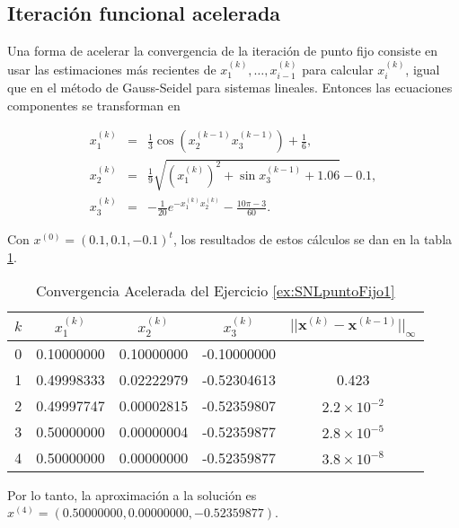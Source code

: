 \subsection{Iteración funcional acelerada}

Una forma de acelerar la convergencia de la iteración de punto fijo consiste en usar las estimaciones más recientes de $x_1^{(k)}, \dots, x_{i-1}^{(k)}$
para calcular $x_i^{(k)}$, igual que en el método de Gauss-Seidel para sistemas lineales. Entonces las ecuaciones componentes se transforman en

\begin{equation*}
  \begin{array}{ccl}
    x_1^{(k)} & = & \frac{1}{3}\cos \left(x_2^{(k-1)}x_3^{(k-1)}\right) + \frac{1}{6},\\
    x_2^{(k)} & = & \frac{1}{9}\sqrt{\left(x_1^{(k)}\right)^2 + \sin x_3^{(k-1)} + 1.06} - 0.1,\\ 
    x_3^{(k)} & = & -\frac{1}{20}e^{-x_1^{(k)}x_2^{(k)}}-\frac{10\pi-3}{60}.    
  \end{array}
\end{equation*}

Con $x^{(0)} = (0.1, 0.1, -0.1)^t$, los resultados de estos cálculos se dan en la tabla \ref{table:exSNLpuntoFijo2}.

\begin{table}[H]
	\centering
	\begin{tabular}{ccccc}
		\toprule
		$k$ & $x_1^{(k)}$ & $x_2^{(k)}$ & $x_3^{(k)}$ & $||\textbf{x}^{(k)} - \textbf{x}^{(k-1)}||_\infty$ \\\midrule
		0 & 0.10000000 & 0.10000000 & -0.10000000 & \\
		1 & 0.49998333 & 0.02222979 & -0.52304613 & 0.423 \\
		2 & 0.49997747 & 0.00002815 & -0.52359807 & $2.2\times 10^{-2}$\\
		3 & 0.50000000 & 0.00000004 & -0.52359877 & $2.8\times 10^{-5}$\\
		4 & 0.50000000 & 0.00000000 & -0.52359877 & $3.8\times 10^{-8}$\\
		\bottomrule
	\end{tabular}
    \caption{Convergencia Acelerada del Ejercicio \ref{ex:SNLpuntoFijo1}}
    \label{table:exSNLpuntoFijo2}
\end{table} 

Por lo tanto, la aproximación a la solución es $x^{(4)} = (0.50000000, 0.00000000, -0.52359877)$.    

